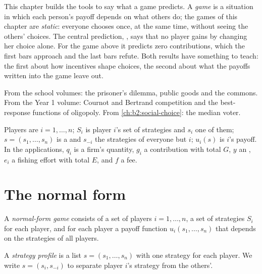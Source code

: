 This chapter builds the tools to say what a game predicts. A \emph{game} is a situation in which each
person's payoff depends on what others do; the games of this chapter are \emph{static}: everyone chooses
once, at the same time, without seeing the others' choices. The central prediction, ,
says that no player gains by changing her choice alone. For the game above it predicts zero
contributions, which the first bars approach and the last bars refute. Both results have something to
teach: the first about how incentives shape choices, the second about what the payoffs written into the
game leave out.

\begin{recall}
From the school volumes: the prisoner's dilemma, public goods and the commons. From the Year 1 volume:
Cournot and Bertrand competition and the best-response functions of oligopoly. From
\cref{ch:b2:social-choice}: the median voter.
\end{recall}

\begin{notation}\label{not:b2:static-games:symbols}
Players are $i = 1, \dots, n$; $S_i$ is player $i$'s set of strategies and $s_i$ one of them; $s = (s_1, \dots,
s_n)$ is a  and $s_{-i}$ the strategies of everyone but $i$; $u_i(s)$ is $i$'s payoff. In the
applications, $q_i$ is a firm's quantity, $g_i$ a contribution with total $G$, $y$ an , $e_i$ a
fishing effort with total $E$, and $f$ a fee.
\end{notation}

\section{The normal form}\label{sec:b2:static-games:normal-form}

\begin{definition}\label{def:b2:static-games:normal-form}
A \emph{normal-form game} consists of a set of players $i = 1, \dots, n$, a set of
strategies $S_i$ for each player, and for each player a payoff function $u_i(s_1, \dots, s_n)$ that depends
on the strategies of all players.
\end{definition}

\begin{definition}\label{def:b2:static-games:profile}
A \emph{strategy profile} is a list $s = (s_1, \dots, s_n)$ with one strategy for
each player. We write $s = (s_i, s_{-i})$ to separate player $i$'s strategy from the others'.
\end{definition}

